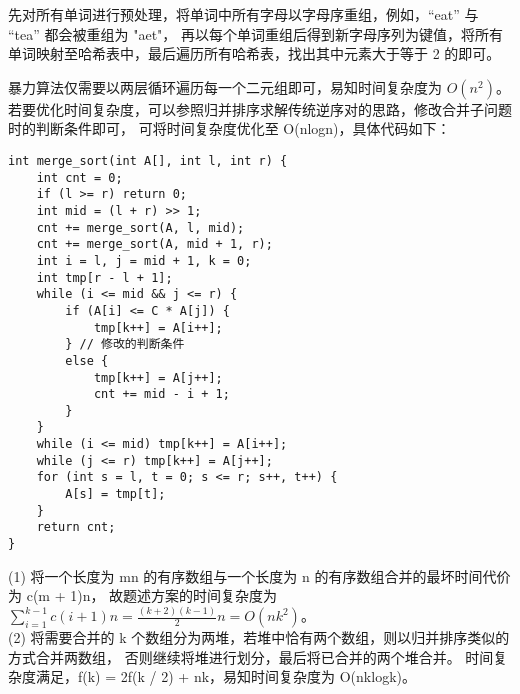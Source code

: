 \documentclass[12pt, a4paper, oneside]{ctexart}
\begin{document}
\begin{solution}[4.14]
先对所有单词进行预处理，将单词中所有字母以字母序重组，例如，“eat” 与 “tea” 都会被重组为 "aet"，
再以每个单词重组后得到新字母序列为键值，将所有单词映射至哈希表中，最后遍历所有哈希表，找出其中元素大于等于 2 的即可。
\end{solution}

\begin{solution}[7.1]
暴力算法仅需要以两层循环遍历每一个二元组即可，易知时间复杂度为 $O(n^2)$。
\\若要优化时间复杂度，可以参照归并排序求解传统逆序对的思路，修改合并子问题时的判断条件即可，
可将时间复杂度优化至 O(nlogn)，具体代码如下：
\newpage
\begin{verbatim}
int merge_sort(int A[], int l, int r) {
    int cnt = 0;
    if (l >= r) return 0;
    int mid = (l + r) >> 1;
    cnt += merge_sort(A, l, mid);
    cnt += merge_sort(A, mid + 1, r);
    int i = l, j = mid + 1, k = 0;
    int tmp[r - l + 1];
    while (i <= mid && j <= r) {
        if (A[i] <= C * A[j]) {
            tmp[k++] = A[i++];
        } // 修改的判断条件
        else {
            tmp[k++] = A[j++];
            cnt += mid - i + 1;
        }
    }
    while (i <= mid) tmp[k++] = A[i++];
    while (j <= r) tmp[k++] = A[j++];
    for (int s = l, t = 0; s <= r; s++, t++) {
        A[s] = tmp[t];
    }
    return cnt;
}
\end{verbatim}
\end{solution}

\newpage
\begin{solution}[7.4]
(1) 将一个长度为 mn 的有序数组与一个长度为 n 的有序数组合并的最坏时间代价为 c(m + 1)n，
故题述方案的时间复杂度为 $\sum_{i = 1}^{k - 1} c(i + 1)n = \frac{(k + 2)(k - 1)}{2}n = O(nk^2)$。
\\(2) 将需要合并的 k 个数组分为两堆，若堆中恰有两个数组，则以归并排序类似的方式合并两数组，
否则继续将堆进行划分，最后将已合并的两个堆合并。
时间复杂度满足，f(k) = 2f(k / 2) + nk，易知时间复杂度为 O(nklogk)。
\end{solution}
\end{document}
